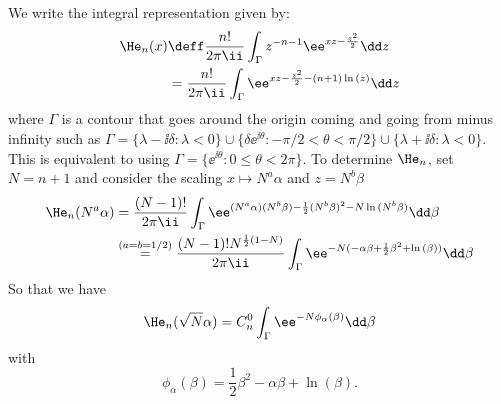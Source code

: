 \begin{exemplo}
	We write the integral representation given by:
	\begin{equation}
		\begin{split}
			\He_n(x) & \deff \frac{n!}{2\pi \ii} \int_{\Gamma} z^{-n-1} \ee^{xz-\frac{z^2}{2}} \dd z \\
			& = \frac{n!}{2\pi \ii} \int_{\Gamma} \ee^{xz-\frac{z^2}{2} - (n+1)\ln{(z)}} \dd z
		\end{split}
	\end{equation}
	where $\Gamma$ is a contour that goes around the origin coming and going from minus infinity such as $\Gamma = \{\lambda - \ii \delta : \lambda < 0 \} \cup \{\delta \ee^{\ii \theta}: -\pi/2 < \theta < \pi/2 \} \cup \{\lambda + \ii \delta : \lambda < 0 \}$. This is equivalent to using $\Gamma = \{\ee^{\ii \theta}: 0 \leq \theta < 2\pi \}$.	To determine $\He_{n}$, set $N = n + 1$ and consider the scaling $x \mapsto N^a \alpha$ and $z = N^b \beta$ 
	\begin{equation}
		\begin{split}
			\He_n(N^a \alpha) & = \frac{(N-1)!}{2\pi \ii} \int_{\Gamma} \ee^{(N^a \alpha)(N^b \beta)- \frac{1}{2}(N^b \beta)^2 - N\ln{(N^b \beta)}} \dd \beta \\
			& \stackrel{(a = b = 1/2)}{=}   \frac{(N-1)! N^{\frac{1}{2}\left(1-N\right)}}{2\pi \ii} \int_{\Gamma}  \ee^{-N(- \alpha \beta+ \frac{1}{2} \beta^2 + \ln{(\beta)})} \dd \beta
		\end{split}
	\end{equation}
	So that we have
	\begin{equation}
		\He_n(\sqrt{N}\alpha) = C_n^0 \int_{\Gamma}  \ee^{-N \phi_\alpha(\beta) } \dd \beta
		\label{Equation: Hermite Integral}
	\end{equation}
	with 
	\begin{equation}
		\phi_\alpha(\beta) = \frac{1}{2} \beta^2 - \alpha \beta + \ln{(\beta)}.
	\end{equation}

\end{exemplo}
